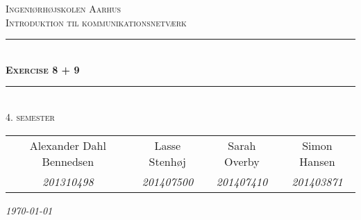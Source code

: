 \newcommand{\HRule}{\rule{\linewidth}{0.1mm}} %
	
\begin{center}
	
\textsc{\LARGE Ingeniørhøjskolen Aarhus}\\[1.5cm] %

\textsc{\large Introduktion til kommunikationsnetværk}\\[2.5cm] 
\HRule \\[0.8cm]
{\huge \bfseries \textsc{Exercise 8 + 9}}\\[0.4cm]
\HRule \\[1.5cm]

\textsc{\large 4. semester}\\
\vspace{0.5 in}
\begin{tabular}{c c c c}
	Alexander Dahl Bennedsen & Lasse Stenhøj & Sarah Overby &  Simon Hansen   \\
	\textsl{201310498} & \textsl{201407500} &\textsl{201407410} & \textsl{201403871}
\end{tabular}

\vspace{2.5 in}

{\large\textit{\today}} \\[3cm]
\vfill %
\end{center} %